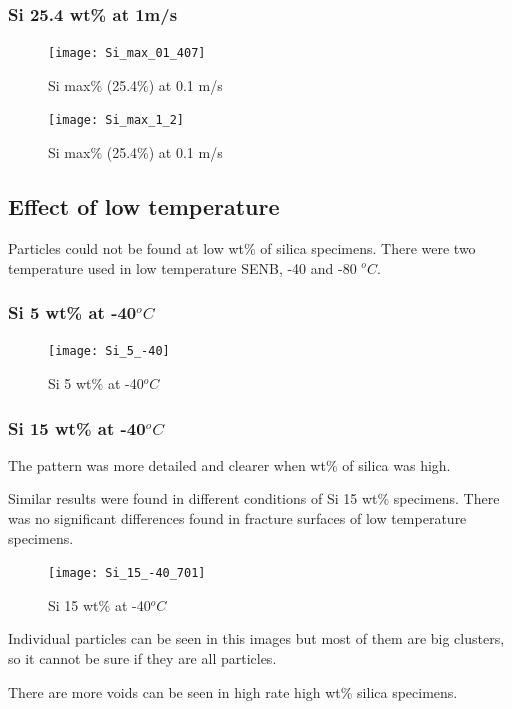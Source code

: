 \documentclass[numbers=noendperiod,chapterprefix=on]{icldt} %
\begin{document}
{\subsubsection{Si 25.4 wt\% at 1m/s}

\begin{figure}[!hp]
\centering
\texttt{[image: Si\_max\_01\_407]}
\caption{Si max\% (25.4\%) at 0.1 m/s} \label{Si_max_0.1_407}
\end{figure}
\FloatBarrier

\begin{figure}[!hp]
\centering
\texttt{[image: Si\_max\_1\_2]}
\caption{Si max\% (25.4\%) at 0.1 m/s} \label{Si_max_1_2}
\end{figure}
\FloatBarrier

\subsection{Effect of low temperature}
Particles could not be found at low wt\% of silica specimens.
There were two temperature used in low temperature SENB, -40 and -80 $^oC$.


\subsubsection{Si 5 wt\% at -40$^oC$}
\begin{figure}[!hp]
\centering
\texttt{[image: Si\_5\_-40]}
\caption{Si 5 wt\% at -40$^oC$} \label{Si_5_-40}
\end{figure}
\FloatBarrier

\subsubsection{Si 15 wt\% at -40$^oC$}
The pattern was more detailed and clearer when wt\% of silica was high.

Similar results were found in different conditions of Si 15 wt\% specimens. There was no significant differences found in fracture surfaces of low temperature specimens.

\begin{figure}[!hp]
\centering
\texttt{[image: Si\_15\_-40\_701]}
\caption{Si 15 wt\% at -40$^oC$} \label{Si_15_-40_701}
\end{figure}
\FloatBarrier

Individual particles can be seen in this images but most of them are big clusters, so it cannot be sure if they are all particles.


There are more voids can be seen in high rate high wt\% silica specimens.

}
\end{document}
